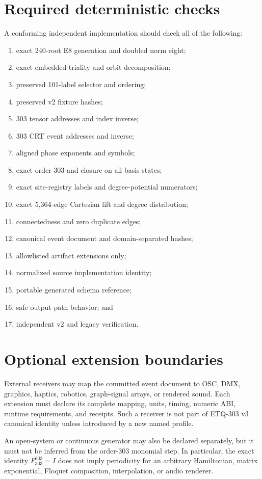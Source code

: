 \documentclass[11pt,a4paper]{article}
\theoremstyle{definition}
\newcommand{\Fthree}{F_{303}}
\begin{document}
\section{Required deterministic checks}
A conforming independent implementation should check all of the following:
\begin{enumerate}
\item exact 240-root E8 generation and doubled norm eight;
\item exact embedded triality and orbit decomposition;
\item preserved 101-label selector and ordering;
\item preserved v2 fixture hashes;
\item 303 tensor addresses and index inverse;
\item 303 CRT event addresses and inverse;
\item aligned phase exponents and symbols;
\item exact order 303 and closure on all basis states;
\item exact site-registry labels and degree-potential numerators;
\item exact 5,364-edge Cartesian lift and degree distribution;
\item connectedness and zero duplicate edges;
\item canonical event document and domain-separated hashes;
\item allowlisted artifact extensions only;
\item normalized source implementation identity;
\item portable generated schema reference;
\item safe output-path behavior; and
\item independent v2 and legacy verification.
\end{enumerate}

\section{Optional extension boundaries}
External receivers may map the committed event document to OSC, DMX, graphics, haptics, robotics, graph-signal arrays, or rendered sound. Each extension must declare its complete mapping, units, timing, numeric ABI, runtime requirements, and receipts. Such a receiver is not part of ETQ-303 v3 canonical identity unless introduced by a new named profile.

An open-system or continuous generator may also be declared separately, but it must not be inferred from the order-303 monomial step. In particular, the exact identity $\Fthree^{303}=I$ does not imply periodicity for an arbitrary Hamiltonian, matrix exponential, Floquet composition, interpolation, or audio renderer.

\printbibliography[title={References}]
\end{document}

